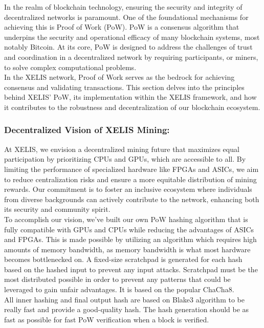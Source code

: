 \documentclass[12pt,a4paper,twocolumn]{article}
\begin{document}
In the realm of blockchain technology, ensuring the security and integrity of decentralized networks is paramount. One of the foundational mechanisms for achieving this is Proof of Work (PoW). PoW is a consensus algorithm that underpins the security and operational efficacy of many blockchain systems, most notably Bitcoin. At its core, PoW is designed to address the challenges of trust and coordination in a decentralized network by requiring participants, or miners, to solve complex computational problems.\\

In the XELIS network, Proof of Work serves as the bedrock for achieving consensus and validating transactions. This section delves into the principles behind XELIS’ PoW, its implementation within the XELIS framework, and how it contributes to the robustness and decentralization of our blockchain ecosystem.\\

\subsubsection{Decentralized Vision of XELIS Mining:}

At XELIS, we envision a decentralized mining future that maximizes equal participation by prioritizing CPUs and GPUs, which are accessible to all. By limiting the performance of specialized hardware like FPGAs and ASICs, we aim to reduce centralization risks and ensure a more equitable distribution of mining rewards. Our commitment is to foster an inclusive ecosystem where individuals from diverse backgrounds can actively contribute to the network, enhancing both its security and community spirit.\\

To accomplish our vision, we’ve built our own PoW hashing algorithm that is fully compatible with GPUs and CPUs while reducing the advantages of ASICs and FPGAs. This is made possible by utilizing an algorithm which requires high amounts of memory bandwidth, as memory bandwidth is what most hardware becomes bottlenecked on. A fixed-size scratchpad is generated for each hash based on the hashed input to prevent any input attacks. Scratchpad must be the most distributed possible in order to prevent any patterns that could be leveraged to gain unfair advantages. It is based on the popular ChaCha8.\\

All inner hashing and final output hash are based on Blake3 algorithm to be really fast and provide a good-quality hash. The hash generation should be as fast as possible for fast PoW verification when a block is verified.\\
\end{document}

